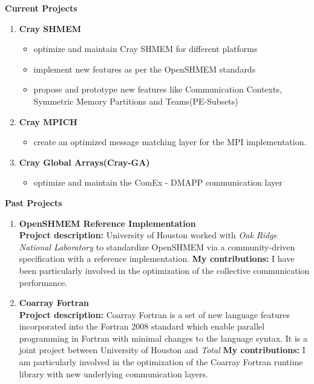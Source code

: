 \textbf{Current Projects}
\begin{enumerate}
\setcounter{enumi}{0}
\item \textbf{Cray SHMEM}
    \begin{itemize}
        \item optimize and maintain Cray SHMEM for different platforms
        \item implement new features as per the OpenSHMEM standards
        \item propose and prototype new features like Communication
        Contexts, Symmetric Memory Partitions and Teams(PE-Subsets)
    \end{itemize}

\item \textbf{Cray MPICH}
    \begin{itemize}
        \item create an optimized message matching layer for the MPI
        implementation.
    \end{itemize}

\item \textbf{Cray Global Arrays(Cray-GA)}
    \begin{itemize}
        \item optimize and maintain the ComEx - DMAPP communication layer
    \end{itemize}
\end{enumerate}

\textbf{Past Projects}
\begin{enumerate}
\setcounter{enumi}{0}
\item \textbf{OpenSHMEM Reference Implementation}\\
      \textbf{Project description:} University of Houston worked with \textit{Oak
      Ridge National Laboratory} to standardize OpenSHMEM via a community-driven
      specification with a reference implementation. \textbf{My contributions:}
      I have been particularly involved in the optimization of the collective
      communication performance.

\item \textbf{Coarray Fortran}\\
     \textbf{Project description:} Coarray Fortran is a set of new language
     features incorporated into the Fortran 2008 standard which enable parallel
     programming in Fortran with minimal changes to the language syntax. It is a
     joint project between University of Houston and \textit{Total}
     \textbf{My contributions:} I am particularly involved in the optimization
     of the Coarray Fortran runtime library with new underlying communication
     layers.
\end{enumerate}
